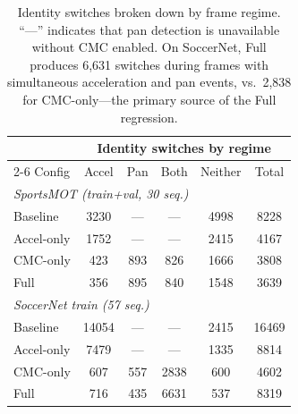 \begin{table}[t]
  \centering
  \small
  \begin{tabular}{lccccc}
    \toprule
    & \multicolumn{5}{c}{Identity switches by regime} \\
    \cmidrule(lr){2-6}
    Config & Accel & Pan & Both & Neither & Total \\
    \midrule
    \multicolumn{6}{l}{\emph{SportsMOT (train+val, 30 seq.)}} \\
    Baseline      & 3230 & ---  & ---  & 4998 & 8228 \\
    Accel-only    & 1752 & ---  & ---  & 2415 & 4167 \\
    CMC-only      &  423 &  893 &  826 & 1666 & 3808 \\
    Full          &  356 &  895 &  840 & 1548 & 3639 \\
    \midrule
    \multicolumn{6}{l}{\emph{SoccerNet train (57 seq.)}} \\
    Baseline      & 14054 & --- & ---  & 2415 & 16469 \\
    Accel-only    &  7479 & --- & ---  & 1335 &  8814 \\
    CMC-only      &   607 & 557 & 2838 &  600 &  4602 \\
    Full          &   716 & 435 & 6631 &  537 &  8319 \\
    \bottomrule
  \end{tabular}
  \caption{Identity switches broken down by frame regime. ``---'' indicates
  that pan detection is unavailable without CMC enabled. On SoccerNet, Full
  produces 6{,}631 switches during frames with simultaneous acceleration and
  pan events, vs.\ 2{,}838 for CMC-only---the primary source of the Full
  regression.}
  \label{tab:regime}
\end{table}
